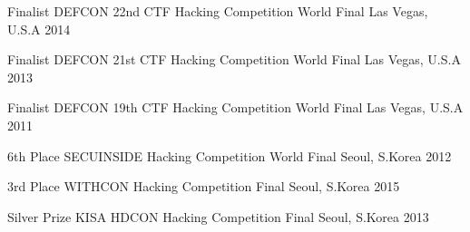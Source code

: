 

\begin{cvhonors}

  \cvhonor
  {Finalist} %
  {DEFCON 22nd CTF Hacking Competition World Final} %
  {Las Vegas, U.S.A} %
  {2014} %

  \cvhonor
  {Finalist} %
  {DEFCON 21st CTF Hacking Competition World Final} %
  {Las Vegas, U.S.A} %
  {2013} %

  \cvhonor
  {Finalist} %
  {DEFCON 19th CTF Hacking Competition World Final} %
  {Las Vegas, U.S.A} %
  {2011} %

  \cvhonor
  {6th Place} %
  {SECUINSIDE Hacking Competition World Final} %
  {Seoul, S.Korea} %
  {2012} %

\end{cvhonors}


\begin{cvhonors}

  \cvhonor
  {3rd Place} %
  {WITHCON Hacking Competition Final} %
  {Seoul, S.Korea} %
  {2015} %

  \cvhonor
  {Silver Prize} %
  {KISA HDCON Hacking Competition Final} %
  {Seoul, S.Korea} %
  {2013} %

\end{cvhonors}
